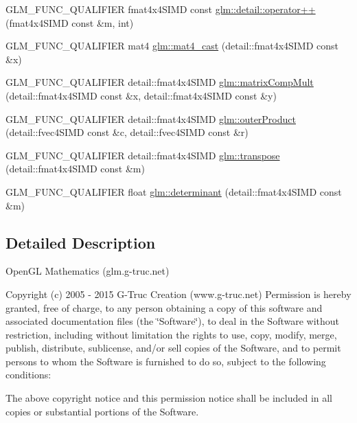 \begin{DoxyCompactItemize}
\item 
G\+L\+M\+\_\+\+F\+U\+N\+C\+\_\+\+Q\+U\+A\+L\+I\+F\+I\+E\+R fmat4x4\+S\+I\+M\+D const \hyperlink{namespaceglm_1_1detail_afef703ea9bc24f3b3abbcc36e5ef65bb}{glm\+::detail\+::operator++} (fmat4x4\+S\+I\+M\+D const \&m, int)
\item 
G\+L\+M\+\_\+\+F\+U\+N\+C\+\_\+\+Q\+U\+A\+L\+I\+F\+I\+E\+R mat4 \hyperlink{namespaceglm_aaea24a8e252f68832f4d368be2035889}{glm\+::mat4\+\_\+cast} (detail\+::fmat4x4\+S\+I\+M\+D const \&x)
\item 
G\+L\+M\+\_\+\+F\+U\+N\+C\+\_\+\+Q\+U\+A\+L\+I\+F\+I\+E\+R detail\+::fmat4x4\+S\+I\+M\+D \hyperlink{namespaceglm_a3f8b69f9fddfae106e1a18ad66a17a1a}{glm\+::matrix\+Comp\+Mult} (detail\+::fmat4x4\+S\+I\+M\+D const \&x, detail\+::fmat4x4\+S\+I\+M\+D const \&y)
\item 
G\+L\+M\+\_\+\+F\+U\+N\+C\+\_\+\+Q\+U\+A\+L\+I\+F\+I\+E\+R detail\+::fmat4x4\+S\+I\+M\+D \hyperlink{namespaceglm_a24beb25b08989724431540bb9279937c}{glm\+::outer\+Product} (detail\+::fvec4\+S\+I\+M\+D const \&c, detail\+::fvec4\+S\+I\+M\+D const \&r)
\item 
G\+L\+M\+\_\+\+F\+U\+N\+C\+\_\+\+Q\+U\+A\+L\+I\+F\+I\+E\+R detail\+::fmat4x4\+S\+I\+M\+D \hyperlink{namespaceglm_a8a85a6f79193f0789bd2ed17802b70f6}{glm\+::transpose} (detail\+::fmat4x4\+S\+I\+M\+D const \&m)
\item 
G\+L\+M\+\_\+\+F\+U\+N\+C\+\_\+\+Q\+U\+A\+L\+I\+F\+I\+E\+R float \hyperlink{namespaceglm_a3d33b661dfd45c27b41440cd02605c05}{glm\+::determinant} (detail\+::fmat4x4\+S\+I\+M\+D const \&m)
\end{DoxyCompactItemize}


\subsection{Detailed Description}
Open\+G\+L Mathematics (glm.\+g-\/truc.\+net)

Copyright (c) 2005 -\/ 2015 G-\/\+Truc Creation (www.\+g-\/truc.\+net) Permission is hereby granted, free of charge, to any person obtaining a copy of this software and associated documentation files (the \char`\"{}\+Software\char`\"{}), to deal in the Software without restriction, including without limitation the rights to use, copy, modify, merge, publish, distribute, sublicense, and/or sell copies of the Software, and to permit persons to whom the Software is furnished to do so, subject to the following conditions\+:

The above copyright notice and this permission notice shall be included in all copies or substantial portions of the Software.

